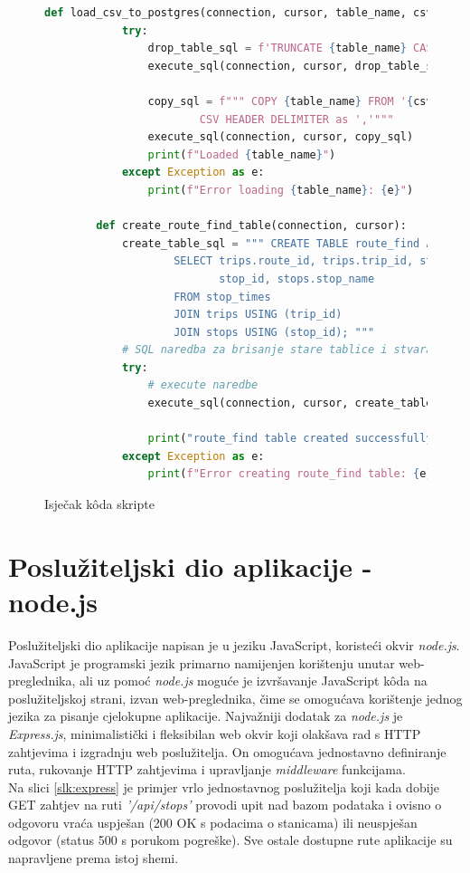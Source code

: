 \documentclass[zavrsnirad]{fer}
\begin{document}
\begin{figure}[H]
	\centering
	\begin{minipage}{0.9\linewidth}
		\begin{lstlisting}[language=Python]
		def load_csv_to_postgres(connection, cursor, table_name, csv_file_path):
			try:
				drop_table_sql = f'TRUNCATE {table_name} CASCADE;'
				execute_sql(connection, cursor, drop_table_sql)

				copy_sql = f""" COPY {table_name} FROM '{csv_file_path}' WITH
						CSV HEADER DELIMITER as ','"""
				execute_sql(connection, cursor, copy_sql)
				print(f"Loaded {table_name}")
			except Exception as e:
				print(f"Error loading {table_name}: {e}")

		def create_route_find_table(connection, cursor):
			create_table_sql = """ CREATE TABLE route_find AS
					SELECT trips.route_id, trips.trip_id, stop_times.stop_sequence,
						   stop_id, stops.stop_name
					FROM stop_times
					JOIN trips USING (trip_id)
					JOIN stops USING (stop_id); """
			# SQL naredba za brisanje stare tablice i stvaranje indeksa
			try:
				# execute naredbe
				execute_sql(connection, cursor, create_table_sql)

				print("route_find table created successfully.")
			except Exception as e:
				print(f"Error creating route_find table: {e}")
		\end{lstlisting}
	\end{minipage}
	\caption{Isječak k\^oda skripte}
	\label{slk:pytonskripta}
\end{figure}
\newpage
\section{Poslužiteljski dio aplikacije - node.js}
Poslužiteljski dio aplikacije napisan je u jeziku JavaScript, koristeći okvir \textit{node.js}. JavaScript je programski jezik primarno namijenjen korištenju unutar web-preglednika, ali uz pomoć \textit{node.js} moguće je izvršavanje JavaScript k\^oda na poslužiteljskoj strani, izvan web-preglednika, čime se omogućava korištenje jednog jezika za pisanje cjelokupne aplikacije. Najvažniji dodatak za \textit{node.js} je \textit{Express.js}, minimalistički i fleksibilan web okvir koji olakšava rad s HTTP zahtjevima i izgradnju web poslužitelja. On omogućava jednostavno definiranje ruta, rukovanje HTTP zahtjevima i upravljanje \textit{middleware} funkcijama.\\
Na slici \ref{slk:express} je primjer vrlo jednostavnog poslužitelja koji kada dobije GET zahtjev na ruti \textit{'/api/stops'} provodi upit nad bazom podataka i ovisno o odgovoru vraća uspješan (200 OK s podacima o stanicama) ili neuspješan odgovor (status 500 s porukom pogreške). Sve ostale dostupne rute aplikacije su napravljene prema istoj shemi.
\end{document}
